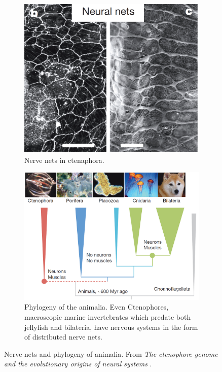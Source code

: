 \begin{figure}
	\centering
	\begin{subfigure}[t]{0.30\textwidth}
		\includegraphics[width=\textwidth]{Figs/neuralNet.png}
		\caption{Nerve nets in ctenaphora.}
		\label{fig:nerveNets}
	\end{subfigure}
	\begin{subfigure}[t]{0.65\textwidth}
		\includegraphics[width=\textwidth]{Figs/animalia3.png}
		\caption{Phylogeny of the animalia. Even Ctenophores, macroscopic marine invertebrates which predate both jellyfish and bilateria, have nervous systems in the form of distributed nerve nets.}
		\label{fig:animalia2}
	\end{subfigure}
	\caption{Nerve nets and phylogeny of animalia. From {\em {T}he ctenophore genome and the evolutionary origins of neural systems} \cite[p.\ 100]{animalia2}.}
\end{figure}

